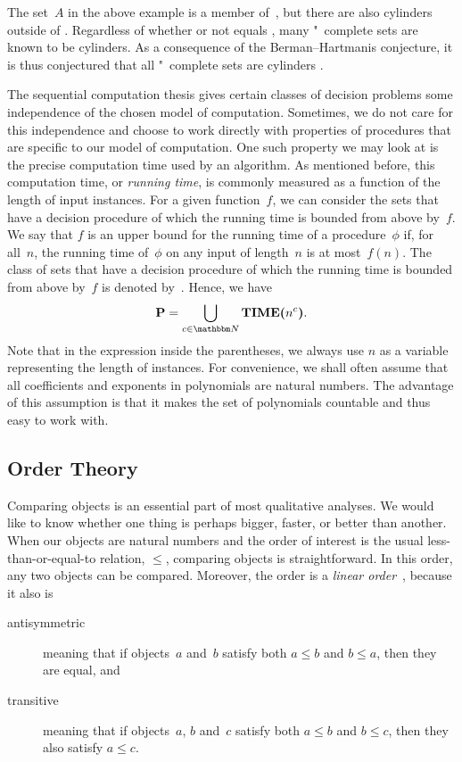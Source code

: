 The set~$A$ in the above example is a member of~, but there are also \pdash{}cylinders outside of  \parencite{allender1988isomorphisms}.
Regardless of whether or not  equals , many "~complete sets are known to be \pdash{}cylinders.
As a consequence of the Berman--Hartmanis conjecture, it is thus conjectured that all "~complete sets are \pdash{}cylinders \parencite[see also][]{hemachandra1991sets}.

The sequential computation thesis gives certain classes of decision problems some independence of the chosen model of computation.
Sometimes, we do not care for this independence and choose to work directly with properties of procedures that are specific to our model of computation.
One such property we may look at is the precise computation time used by an algorithm.
As mentioned before, this computation time, or \emph{running time}, is commonly measured as a function of the length of input instances.
For a given function~$f$, we can consider the sets that have a decision procedure of which the running time is bounded from above by~$f$.
We say that $f$ is an upper bound for the running time of a procedure~$\phi$ if, for all~$n$, the running time of~$\phi$ on any input of length~$n$ is at most~$f(n)$.
The class of sets that have a decision procedure of which the running time is bounded from above by~$f$ is denoted by~.
Hence, we have
\begin{equation*}
  \cl{P} = \bigcup_{c \in \bbN} \cltime{$n^c$}.
\end{equation*}
Note that in the expression inside the parentheses, we always use $n$ as a variable representing the length of instances.
For convenience, we shall often assume that all coefficients and exponents in polynomials are natural numbers.
The advantage of this assumption is that it makes the set of polynomials countable and thus easy to work with.


\subsection{Order Theory}

Comparing objects is an essential part of most qualitative analyses.
We would like to know whether one thing is perhaps bigger, faster, or better than another.
When our objects are natural numbers and the order of interest is the usual less-than-or-equal-to relation, $\le$, comparing objects is straightforward.
In this order, any two objects can be compared.
Moreover, the order is a \emph{linear order}~\parencite{davey2002introduction}, because it also is
\begin{description}
\item[antisymmetric] meaning that if objects~$a$ and~$b$ satisfy both $a \le b$ and $b \le a$, then they are equal, and
\item[transitive] meaning that if objects~$a$, $b$ and~$c$ satisfy both $a \le b$ and $b \le c$, then they also satisfy $a \le c$.
\end{description}

